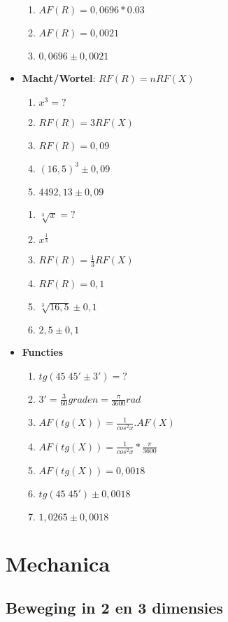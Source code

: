 \documentclass[12pt]{report}
\newcommand{\important}[1] {\textbf{\color{orange}#1}}
\begin{document}
\begin{itemize}
\begin{enumerate}
   \item $AF(R) = 0,0696 * 0.03$
   \item $AF(R) = 0,0021$
   \item \important{$0,0696 \pm 0,0021$}
  \end{enumerate}
  \item {\important{Macht/Wortel}: $RF(R) = nRF(X)$}
  \begin{enumerate}
   \item $x^3 = ?$
   \item $RF(R) = 3RF(X)$
   \item $RF(R) = 0,09$
   \item $(16,5)^3 \pm 0,09$
   \item \important{$4492,13 \pm 0,09$}
  \end{enumerate}
  \begin{enumerate}
   \item $\sqrt[3]{x} = ?$ 
   \item $x^{\frac{1}{3}}$
   \item $RF(R) = \frac{1}{3}RF(X)$
   \item $RF(R)  = 0,1$
   \item $\sqrt[3]{16,5} \pm 0,1$
   \item \important{$2,5 \pm 0,1$}
  \end{enumerate}
  
  \item{\important{Functies}}
  \begin{enumerate}
   \item $tg(45\;45' \pm 3') = ?$
   \item $3' = \frac{3}{60} graden = \frac{\pi}{3600}rad$
   \item $AF(tg(X)) = \frac{1}{cos^2x}.AF(X)$
   \item $AF(tg(X)) = \frac{1}{cos^2x}*\frac{\pi}{3600}$
   \item $AF(tg(X)) = 0,0018$
   \item $tg(45\;45') \pm 0,0018$
   \item \important{$1,0265 \pm 0,0018$}
  \end{enumerate}



\end{itemize}




\part{Mechanica}
\chapter{Beweging in 2 en 3 dimensies}
\end{document}
